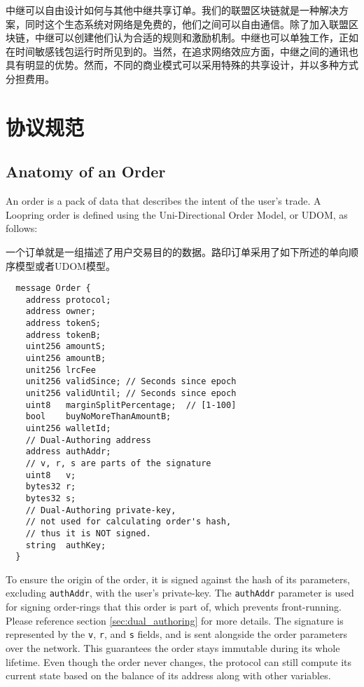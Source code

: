 \documentclass[UTF8,nofonts]{ctexart}
\begin{document}
\begin{multicols}{2}
中继可以自由设计如何与其他中继共享订单。我们的联盟区块链就是一种解决方案，同时这个生态系统对网络是免费的，他们之间可以自由通信。除了加入联盟区块链，中继可以创建他们认为合适的规则和激励机制。中继也可以单独工作，正如在时间敏感钱包运行时所见到的。当然，在追求网络效应方面，中继之间的通讯也具有明显的优势。然而，不同的商业模式可以采用特殊的共享设计，并以多种方式分担费用。


\section{协议规范\label{sec:protocol}}

\subsection{Anatomy of an Order\label{anatomy}}
An order is a pack of data that describes the intent of the user's trade. A Loopring order is defined using the Uni-Directional Order Model, or UDOM, as follows:

一个订单就是一组描述了用户交易目的的数据。路印订单采用了如下所述的单向顺序模型或者UDOM模型。


\begin{verbatim}
  message Order {
    address protocol;
    address owner;
    address tokenS;
    address tokenB;
    uint256 amountS;
    uint256 amountB;
    unit256 lrcFee
    unit256 validSince; // Seconds since epoch
    unit256 validUntil; // Seconds since epoch
    uint8   marginSplitPercentage;  // [1-100]
    bool    buyNoMoreThanAmountB;
    uint256 walletId;
    // Dual-Authoring address
    address authAddr;
   	// v, r, s are parts of the signature
    uint8   v;       
    bytes32 r;
    bytes32 s;
    // Dual-Authoring private-key,
    // not used for calculating order's hash,
    // thus it is NOT signed.
    string  authKey;          
  }
\end{verbatim}


To ensure the origin of the order, it is signed against the hash of its parameters, excluding \verb|authAddr|, with the user's private-key. The \verb|authAddr| parameter is used for signing  order-rings that this order is part of, which prevents front-running. Please reference section \ref{sec:dual_authoring} for more details. The signature is represented by the \verb|v|, \verb|r|, and \verb|s| fields, and is sent alongside the order parameters over the network. This guarantees the order stays immutable during its whole lifetime. Even though the order never changes, the protocol can still compute its current state based on the balance of its address along with other variables.


\end{multicols}
\end{document}
